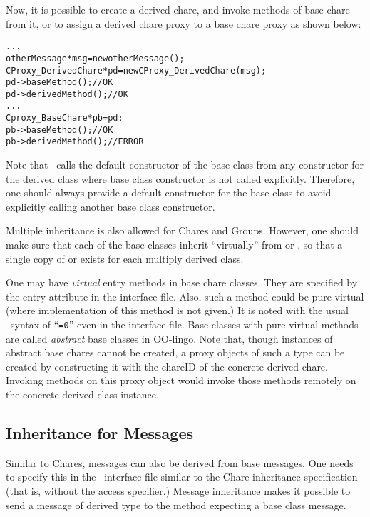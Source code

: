 Now, it is possible to create a derived chare, and invoke methods of base
chare from it, or to assign a derived chare proxy to a base chare proxy
as shown below:

\begin{alltt}
  ...
  otherMessage *msg = new otherMessage();
  CProxy_DerivedChare *pd = new CProxy_DerivedChare(msg);
  pd->baseMethod();     // OK
  pd->derivedMethod();  // OK
  ...
  Cproxy_BaseChare *pb = pd;
  pb->baseMethod();    // OK
  pb->derivedMethod(); // ERROR
\end{alltt}

Note that \CC\ calls the default constructor  of the
base class from any constructor for the derived class where base class
constructor is not called explicitly. Therefore, one should always provide a
default constructor for the base class to avoid explicitly calling another base
class constructor.

Multiple inheritance  is also allowed for Chares
and Groups. However, one should make sure that each of the base classes inherit
``virtually'' from  or , so that a single copy of
 or  exists for each multiply derived class.

One may have {\em virtual} entry methods  in base chare classes.
They are specified by the entry attribute  in the interface file.
Also, such a method could be pure virtual  (where
implementation of this method is not given.) It is noted with the usual \CC\
syntax of ``{\tt =0}'' even in the interface file. Base classes with pure
virtual methods are called {\em abstract} base classes \index{abstract base
class} in OO-lingo. Note that, though instances of abstract base chares cannot
be created, a proxy objects of such a type can be created by constructing it
with the chareID of the concrete derived chare. Invoking methods on this proxy
object would invoke those methods remotely on the concrete derived class
instance.

\subsection{Inheritance for Messages}

Similar to Chares, messages can also be derived from base messages. One needs
to specify this in the \charmpp\ interface file similar to the Chare
inheritance specification (that is, without the \kw{public} access specifier.)
Message inheritance makes it possible to send a message of derived type to the
method expecting a base class message.

